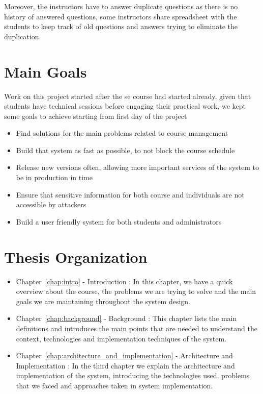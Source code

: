 \newParagraph
Moreover, the instructors have to answer duplicate questions as there is no history of answered questions, some instructors share
spreadsheet with the students to keep track of old questions and answers trying to eliminate the duplication.

\section{Main Goals}
\label{sec:main-goals}
Work on this project started after the \ac{se} course had started already, given that students have technical sessions before
engaging their practical work, we kept some goals to achieve starting from first day of the project
\begin{itemize}
  \item Find solutions for the main problems related to course management
  \item Build that system as fast as possible, to not block the course schedule
  \item Release new versions often, allowing more important services of the system to be in production in time
  \item Ensure that sensitive information for both course and individuals are not accessible by attackers
  \item Build a user friendly system for both students and administrators
\end{itemize}

\section{Thesis Organization}
\label{sec:thesis-organization}
\begin{itemize}
  \item Chapter~\ref{chap:intro} - Introduction : In this chapter, we have a quick overview about the course, the problems
  we are trying to solve and the main goals we are maintaining throughout the system design.
  \item Chapter~\ref{chap:background} - Background : This chapter lists the main definitions and introduces the main points that
  are needed to understand the context, technologies and implementation techniques of the system.
  \item Chapter~\ref{chap:architecture_and_implementation} - Architecture and Implementation : In the third chapter we explain the architecture
  and implementation of the system, introducing the technologies used, problems that we faced and approaches taken in system implementation.
\end{itemize}
